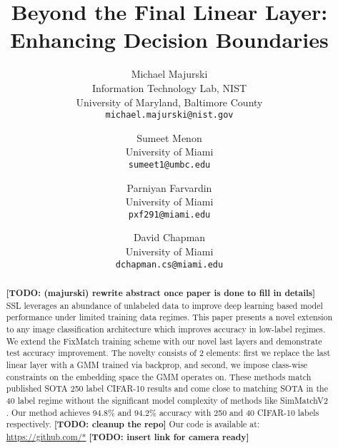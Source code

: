 \documentclass[10pt,twocolumn,letterpaper]{article}
\newcommand{\TODO}[1]{\textbf{\color{red}[TODO: #1]}}
\begin{document}
	
	\title{Beyond the Final Linear Layer: Enhancing Decision Boundaries}
	
	\author{Michael Majurski\\
		Information Technology Lab, NIST\\
		University of Maryland, Baltimore County\\
		{\tt\small michael.majurski@nist.gov}
	\and
	Sumeet Menon\\
	University of  Miami\\
	{\tt\small sumeet1@umbc.edu}
	\and
	Parniyan Farvardin\\
	University of Miami\\
	{\tt\small pxf291@miami.edu}
	\and
	David Chapman\\
	University of Miami\\
	{\tt\small dchapman.cs@miami.edu}
}

\maketitle


\begin{abstract}
	\TODO {(majurski) rewrite abstract once paper is done to fill in details}
	SSL leverages an abundance of unlabeled data to improve deep learning based model performance under limited training data regimes.
	This paper presents a novel extension to any image classification architecture which improves accuracy in low-label regimes. 
	We extend the FixMatch \cite{sohn2020fixmatch} training scheme with our novel last layers and demonstrate test accuracy improvement. 
	The novelty consists of 2 elements: first we replace the last linear layer with a GMM trained via backprop, and second, we impose class-wise constraints on the embedding space the GMM operates on.
	These methods match published SOTA 250 label CIFAR-10 \cite{cifar10} results and come close to matching SOTA in the 40 label regime without the significant model complexity of methods like SimMatchV2 \cite{zheng2023simmatchv2}.
	Our method achieves 94.8\% and 94.2\% accuracy with 250 and 40 CIFAR-10 labels respectively.
	\TODO {cleanup the repo}
	Our code is available at: \url{https://github.com/*} \TODO {insert link for camera ready} %
\end{abstract}
\end{document}
